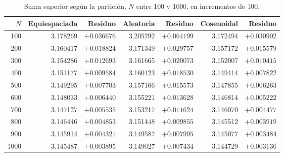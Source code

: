 \begin{table}[H]
\centering
\caption{Suma superior según la partición, \(N\) entre 100 y 1000, en incrementos de 100.}
\label{tab:e2_100a1000}
\small
\setlength{\tabcolsep}{4pt}
\begin{tabular}{r r r r r r r}
\toprule
\(N\) & Equiespaciada & Residuo & Aleatoria & Residuo & Cosenoidal & Residuo \\
\midrule
100   & 3.178269 & \(+0.036676\) & 3.205792 & \(+0.064199\) & 3.172494 & \(+0.030902\) \\
200   & 3.160417 & \(+0.018824\) & 3.171349 & \(+0.029757\) & 3.157172 & \(+0.015579\) \\
300   & 3.154286 & \(+0.012693\) & 3.161665 & \(+0.020073\) & 3.152007 & \(+0.010415\) \\
400   & 3.151177 & \(+0.009584\) & 3.160123 & \(+0.018530\) & 3.149414 & \(+0.007822\) \\
500   & 3.149295 & \(+0.007703\) & 3.157166 & \(+0.015573\) & 3.147855 & \(+0.006263\) \\
600   & 3.148033 & \(+0.006440\) & 3.155221 & \(+0.013628\) & 3.146814 & \(+0.005222\) \\
700   & 3.147127 & \(+0.005535\) & 3.153217 & \(+0.011624\) & 3.146070 & \(+0.004477\) \\
800   & 3.146446 & \(+0.004853\) & 3.151448 & \(+0.009855\) & 3.145512 & \(+0.003919\) \\
900   & 3.145914 & \(+0.004321\) & 3.149587 & \(+0.007995\) & 3.145077 & \(+0.003484\) \\
1000  & 3.145487 & \(+0.003895\) & 3.149027 & \(+0.007434\) & 3.144729 & \(+0.003136\) \\
\bottomrule
\end{tabular}
\end{table}

